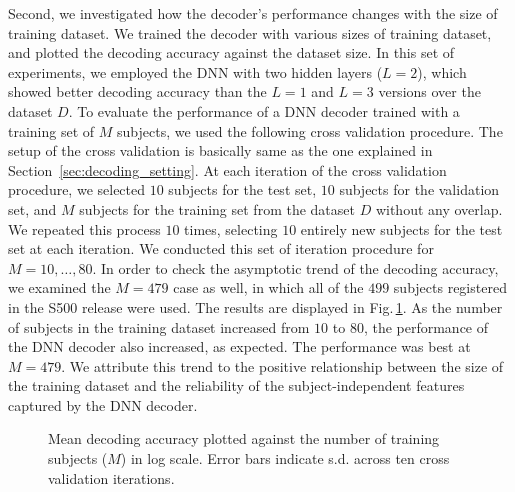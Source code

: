 Second, we investigated how the decoder's performance changes with the size of training dataset.
We trained the decoder with various sizes of training dataset, and plotted the decoding accuracy against the dataset size.
In this set of experiments, we employed the DNN with two hidden layers ($L = 2$),
which showed better decoding accuracy than the $L = 1$ and $L = 3$ versions over the dataset $D$.
To evaluate the performance of a DNN decoder trained with a training set of $M$ subjects,
we used the following cross validation procedure.
The setup of the cross validation is basically same as the one explained in Section~\ref{sec:decoding_setting}.
%
At each iteration of the cross validation procedure, we selected $10$ subjects for the test set, $10$ subjects for the validation set, and $M$ subjects for the training set from the dataset $D$ without any overlap.
%
We repeated this process $10$ times, selecting $10$ entirely new subjects for the test set at each iteration.
%
We conducted this set of iteration procedure for $M = 10, \dots, 80$.
%
In order to check the asymptotic trend of the decoding accuracy, we examined the $M = 479$ case as well, in which all of the $499$ subjects registered in the S500 release were used.
The results are displayed in Fig.\,\ref{fig:change_n}.
As the number of subjects in the training dataset increased from $10$ to $80$, the performance of the DNN decoder also increased, as expected.
%
The performance was best at $M = 479$.
%
We attribute this trend to the positive relationship between the size of the training dataset and the reliability of the subject-independent features captured by the DNN decoder.
%
\begin{figure}[thbp]
\begin{center}
\caption{\label{fig:change_n}
Mean decoding accuracy plotted against the number of training subjects ($M$) in log scale.
Error bars indicate s.d. across ten cross validation iterations.}
\end{center}
\end{figure}
%

